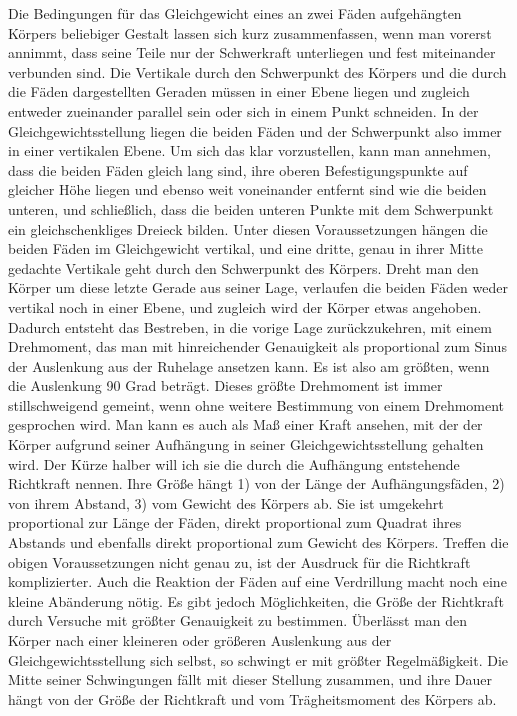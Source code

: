 Die Bedingungen für das Gleichgewicht eines an zwei Fäden aufgehängten Körpers beliebiger Gestalt lassen sich kurz zusammenfassen, wenn man vorerst annimmt, dass seine Teile nur der Schwerkraft unterliegen und fest miteinander verbunden sind. Die Vertikale durch den Schwerpunkt des Körpers und die durch die Fäden dargestellten Geraden müssen in einer Ebene liegen und zugleich entweder zueinander parallel sein oder sich in einem Punkt schneiden. In der Gleichgewichtsstellung liegen die beiden Fäden und der Schwerpunkt also immer in einer vertikalen Ebene. Um sich das klar vorzustellen, kann man annehmen, dass die beiden Fäden gleich lang sind, ihre oberen Befestigungspunkte auf gleicher Höhe liegen und ebenso weit voneinander entfernt sind wie die beiden unteren, und schließlich, dass die beiden unteren Punkte mit dem Schwerpunkt ein gleichschenkliges Dreieck bilden. Unter diesen Voraussetzungen hängen die beiden Fäden im Gleichgewicht vertikal, und eine dritte, genau in ihrer Mitte gedachte Vertikale geht durch den Schwerpunkt des Körpers. Dreht man den Körper um diese letzte Gerade aus seiner Lage, verlaufen die beiden Fäden weder vertikal noch in einer Ebene, und zugleich wird der Körper etwas angehoben. Dadurch entsteht das Bestreben, in die vorige Lage zurückzukehren, mit einem Drehmoment, das man mit hinreichender Genauigkeit als proportional zum Sinus der Auslenkung aus der Ruhelage ansetzen kann. Es ist also am größten, wenn die Auslenkung 90 Grad beträgt. Dieses größte Drehmoment ist immer stillschweigend gemeint, wenn ohne weitere Bestimmung von einem Drehmoment gesprochen wird. Man kann es auch als Maß einer Kraft ansehen, mit der der Körper aufgrund seiner Aufhängung in seiner Gleichgewichtsstellung gehalten wird. Der Kürze halber will ich sie die durch die Aufhängung entstehende Richtkraft nennen. Ihre Größe hängt 1) von der Länge der Aufhängungsfäden, 2) von ihrem Abstand, 3) vom Gewicht des Körpers ab. Sie ist umgekehrt proportional zur Länge der Fäden, direkt proportional zum Quadrat ihres Abstands und ebenfalls direkt proportional zum Gewicht des Körpers. Treffen die obigen Voraussetzungen nicht genau zu, ist der Ausdruck für die Richtkraft komplizierter. Auch die Reaktion der Fäden auf eine Verdrillung macht noch eine kleine Abänderung nötig. Es gibt jedoch Möglichkeiten, die Größe der Richtkraft durch Versuche mit größter Genauigkeit zu bestimmen. Überlässt man den Körper nach einer kleineren oder größeren Auslenkung aus der Gleichgewichtsstellung sich selbst, so schwingt er mit größter Regelmäßigkeit. Die Mitte seiner Schwingungen fällt mit dieser Stellung zusammen, und ihre Dauer hängt von der Größe der Richtkraft und vom Trägheitsmoment des Körpers ab.

